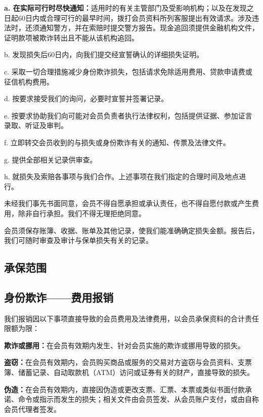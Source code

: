\documentclass[UTF8,fontset=none,11pt,a4paper]{ctexart}
\begin{document}
\textbf{a. 在实际可行时尽快通知：}适用时的有关主管部门及受影响机构；以及在发现之日起60日内或合理可行的最早时间，拨打会员资料所列客服提出有效请求。涉及违法时，还须通知警方，并在索赔时提交警方报告。现金追回须提供金融机构文件，证明款项被欺诈转出且不能从该\allowbreak\mbox{机构追回。}


b. 发现损失后60日内，向我们提交经宣誓确认的详细\allowbreak\mbox{损失证明。}


c. 采取一切合理措施减少身份欺诈损失，包括请求免除适用费用、贷款申请费或征信\allowbreak\mbox{机构费用。}


d. 按要求接受我们的询问，必要时宣誓并\allowbreak\mbox{签署记录。}


e. 按要求协助我们向可能对会员负责者执行法律权利，包括提供证据、参加证言录取、听\allowbreak\mbox{证及审判。}


f. 立即转交会员收到的与损失或身份欺诈有关的通知、传票及\allowbreak\mbox{法律文件。}


g. 提供全部相关记\allowbreak\mbox{录供审查。}


h. 就损失及索赔各事项与我们合作。上述事项在我们指定的合理时间及\allowbreak\mbox{地点进行。}


未经我们事先书面同意，会员不得自愿承担或承认责任，也不得自愿付款或产生费用，除非自行承担。我们不得无理\allowbreak\mbox{拒绝同意。}


会员须保存账簿、收据、账单及其他记录，使我们能准确确定损失金额。报告后，我们可随时审查及审计与保单损失有\allowbreak\mbox{关的记录。}


\subsection*{承保范围}
\subsection*{身份欺诈——费用报销}
我们报销因以下事项直接导致的会员费用及法律费用，以会员承保资料的合计责任\allowbreak\mbox{限额为限：}


\textbf{欺诈或挪用：}在会员有效期内发生、针对会员实施的欺诈或挪用导\allowbreak\mbox{致的损失。}


\textbf{盗窃：}在会员有效期内，会员购买商品或服务的交易对方盗窃与会员资料、支票簿、储蓄记录、自动取款机（ATM）访问或证券有关的财产，直接导致\allowbreak\mbox{的损失。}


\textbf{伪造：}在会员有效期内，直接因伪造或更改支票、汇票、本票或类似书面付款承诺、命令或指示而发生的损失；相关文件由会员签发、从会员账户支付，或由自称会员代\allowbreak\mbox{理者签发。}
\end{document}
